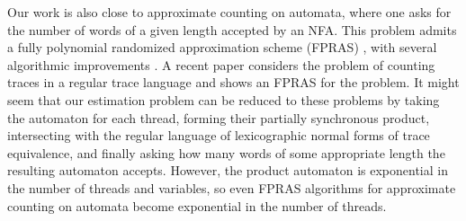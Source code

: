 \documentclass[acmsmall]{acmart}
\begin{document}
Our work is also close to approximate counting on automata, where one asks for the number of words of a given length accepted by an NFA. 
This problem admits a fully polynomial randomized approximation scheme (FPRAS) \cite{GoreJKSM97,10.1145/3422648.3422661}, 
with several algorithmic improvements \cite{meel2024fasterfprasnfa,meel2025practicalfprasnfaexploiting}.
A recent paper \cite{ColnetMM26} considers the problem of counting traces in a regular trace language and shows an FPRAS for the problem.
It might seem that our estimation problem can be reduced to these problems by taking the automaton for each thread, forming their partially synchronous product, 
intersecting with the regular language of lexicographic normal forms of trace equivalence, and finally asking how many words of some appropriate length the resulting automaton accepts. 
However, the product automaton is exponential in the number of threads and variables, so even FPRAS algorithms for approximate counting on automata become exponential in the number of threads. 
\end{document}
